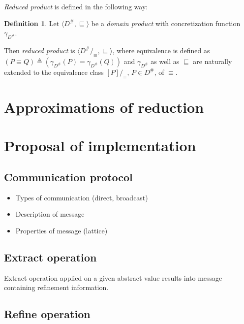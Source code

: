 \documentclass[12pt,oneside]{fithesis2}
\theoremstyle{definition}
\newtheorem{definition}{Definition}
\begin{document}
\textit{Reduced product} is defined in the following way: \cite{CousotCousotMauborgne-FoSSaCS-11}

\begin{definition}
  Let $\langle D^\#, \sqsubseteq \rangle$ be a \textit{domain product} with concretization function $\gamma_{D^\#}$.

  Then \textit{reduced product} is $\langle D^\# /_\equiv, \sqsubseteq \rangle$, where equivalence is defined as  $\left(P \equiv Q \right) \triangleq \left(\gamma_{D^\#}(P) = \gamma_{D^\#}(Q) \right)$ and $\gamma_{D^\#}$ as well as $\sqsubseteq$ are naturally extended to the equivalence class $[P]/_\equiv$, $P \in D^\#$, of $\equiv$.
\end{definition}

\section{Approximations of reduction}\label{sec:reductions}

\section{Proposal of implementation}\label{sec:proposal-of-implementation}

\subsection{Communication protocol}
\begin{itemize}
  \item Types of communication (direct, broadcast)
  \item Description of message
  \item Properties of message (lattice)
\end{itemize}

\subsection{Extract operation}

Extract operation applied on a given abstract value results into message containing refinement information.

\subsection{Refine operation}
\end{document}
